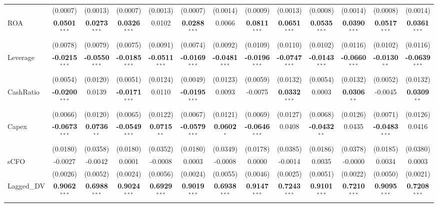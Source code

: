 \documentclass[11pt,a4paper]{article}
\begin{document}
\begin{table}[htbp]
\begin{tabular}{lcccccccccccc}
 & (0.0007) & (0.0013) & (0.0007) & (0.0013) & (0.0007) & (0.0014) & (0.0009) & (0.0013) & (0.0008) & (0.0014) & (0.0008) & (0.0014) \\
ROA & \textbf{0.0501}$^{***}$ & \textbf{0.0273}$^{***}$ & \textbf{0.0326}$^{***}$ & 0.0102 & \textbf{0.0288}$^{***}$ & 0.0066 & \textbf{0.0811}$^{***}$ & \textbf{0.0651}$^{***}$ & \textbf{0.0535}$^{***}$ & \textbf{0.0390}$^{***}$ & \textbf{0.0517}$^{***}$ & \textbf{0.0361}$^{***}$ \\
 & (0.0078) & (0.0079) & (0.0075) & (0.0091) & (0.0074) & (0.0092) & (0.0109) & (0.0110) & (0.0102) & (0.0116) & (0.0102) & (0.0116) \\
Leverage & \textbf{-0.0215}$^{***}$ & \textbf{-0.0550}$^{***}$ & \textbf{-0.0185}$^{***}$ & \textbf{-0.0511}$^{***}$ & \textbf{-0.0169}$^{***}$ & \textbf{-0.0481}$^{***}$ & \textbf{-0.0196}$^{***}$ & \textbf{-0.0747}$^{***}$ & \textbf{-0.0143}$^{***}$ & \textbf{-0.0660}$^{***}$ & \textbf{-0.0130}$^{**}$ & \textbf{-0.0639}$^{***}$ \\
 & (0.0054) & (0.0120) & (0.0051) & (0.0124) & (0.0049) & (0.0123) & (0.0059) & (0.0132) & (0.0054) & (0.0132) & (0.0052) & (0.0132) \\
CashRatio & \textbf{-0.0200}$^{***}$ & 0.0139 & \textbf{-0.0171}$^{***}$ & 0.0110 & \textbf{-0.0195}$^{***}$ & 0.0093 & -0.0075 & \textbf{0.0332}$^{***}$ & 0.0003 & \textbf{0.0306}$^{**}$ & -0.0045 & \textbf{0.0309}$^{**}$ \\
 & (0.0066) & (0.0120) & (0.0065) & (0.0122) & (0.0067) & (0.0121) & (0.0069) & (0.0127) & (0.0068) & (0.0126) & (0.0071) & (0.0126) \\
Capex & \textbf{-0.0673}$^{***}$ & \textbf{0.0736}$^{**}$ & \textbf{-0.0549}$^{***}$ & \textbf{0.0715}$^{**}$ & \textbf{-0.0579}$^{***}$ & \textbf{0.0602}$^{*}$ & \textbf{-0.0646}$^{***}$ & 0.0408 & \textbf{-0.0432}$^{**}$ & 0.0435 & \textbf{-0.0483}$^{***}$ & 0.0416 \\
 & (0.0180) & (0.0358) & (0.0180) & (0.0352) & (0.0180) & (0.0349) & (0.0178) & (0.0385) & (0.0186) & (0.0378) & (0.0185) & (0.0380) \\
sCFO & -0.0027 & -0.0042 & 0.0001 & -0.0008 & 0.0003 & -0.0008 & 0.0000 & -0.0014 & 0.0035 & -0.0000 & 0.0034 & 0.0003 \\
 & (0.0026) & (0.0052) & (0.0024) & (0.0056) & (0.0024) & (0.0055) & (0.0046) & (0.0025) & (0.0051) & (0.0022) & (0.0050) & (0.0021) \\
Lagged\_DV & \textbf{0.9062}$^{***}$ & \textbf{0.6988}$^{***}$ & \textbf{0.9024}$^{***}$ & \textbf{0.6929}$^{***}$ & \textbf{0.9019}$^{***}$ & \textbf{0.6938}$^{***}$ & \textbf{0.9147}$^{***}$ & \textbf{0.7243}$^{***}$ & \textbf{0.9101}$^{***}$ & \textbf{0.7210}$^{***}$ & \textbf{0.9095}$^{***}$ & \textbf{0.7208}$^{***}$ \\

\end{tabular}
\end{table}
\end{document}
